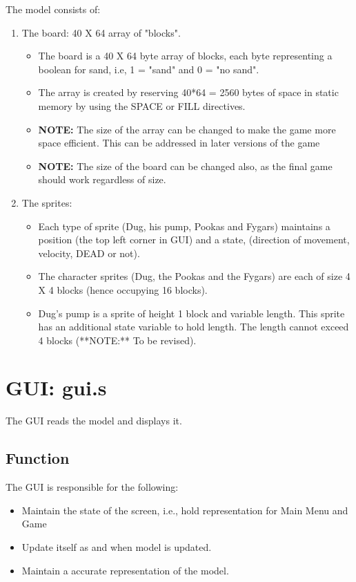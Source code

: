 The model consists of:

\begin{enumerate}
  \item The board: 40 X 64 array of "blocks".
  \begin{itemize}
    \item The board is a 40 X 64 byte array of blocks, each byte representing a boolean for sand, i.e, 1 = "sand" and 0 = "no sand".
    \item The array is created by reserving 40*64 = 2560 bytes of space in static memory by using the SPACE or FILL directives.
    \item \textbf{NOTE:} The size of the array can be changed to make the game more space efficient. This can be addressed in later versions of the game
    \item \textbf{NOTE:} The size of the board can be changed also, as the final game should work regardless of size.
  \end{itemize}

  \item The sprites:
  \begin{itemize}
    \item Each type of sprite (Dug, his pump, Pookas and Fygars) maintains a position (the top left corner in GUI) and a state, (direction of movement, velocity, DEAD or not).
    \item The character sprites (Dug, the Pookas and the Fygars) are each of size 4 X 4 blocks (hence occupying 16 blocks).
    \item Dug's pump is a sprite of height 1 block and variable length. This sprite has an additional state variable to hold length. The length cannot exceed 4 blocks (**NOTE:** To be revised).
  \end{itemize}
\end{enumerate}

\section{GUI: gui.s}

The GUI reads the model and displays it.

\subsection{Function}

The GUI is responsible for the following:

\begin{itemize}
  \item Maintain the state of the screen, i.e., hold representation for Main Menu and Game
  \item Update itself as and when model is updated.
  \item Maintain a accurate representation of the model.
\end{itemize}


